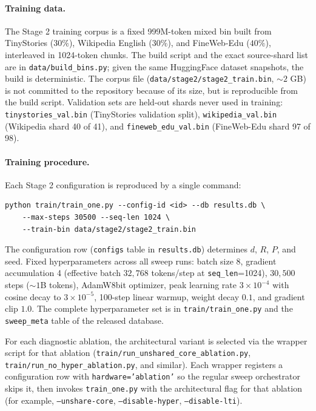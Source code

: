 \documentclass{article}
\begin{document}
\paragraph{Training data.}
The Stage 2 training corpus is a fixed 999M-token mixed bin built from TinyStories ($30\%$), Wikipedia English ($30\%$), and FineWeb-Edu ($40\%$), interleaved in 1024-token chunks. The build script and the exact source-shard list are in \texttt{data/build\_bins.py}; given the same HuggingFace dataset snapshots, the build is deterministic. The corpus file (\texttt{data/stage2/stage2\_train.bin}, $\sim 2$ GB) is not committed to the repository because of its size, but is reproducible from the build script. Validation sets are held-out shards never used in training: \texttt{tinystories\_val.bin} (TinyStories validation split), \texttt{wikipedia\_val.bin} (Wikipedia shard 40 of 41), and \texttt{fineweb\_edu\_val.bin} (FineWeb-Edu shard 97 of 98).

\paragraph{Training procedure.}
Each Stage 2 configuration is reproduced by a single command:
\begin{verbatim}
python train/train_one.py --config-id <id> --db results.db \
    --max-steps 30500 --seq-len 1024 \
    --train-bin data/stage2/stage2_train.bin
\end{verbatim}
The configuration row (\texttt{configs} table in \texttt{results.db}) determines $d$, $R$, $P$, and seed. Fixed hyperparameters across all sweep runs: batch size 8, gradient accumulation 4 (effective batch $32{,}768$ tokens/step at \texttt{seq\_len}=1024), $30{,}500$ steps ($\sim 1$B tokens), AdamW8bit optimizer, peak learning rate $3 \times 10^{-4}$ with cosine decay to $3 \times 10^{-5}$, 100-step linear warmup, weight decay $0.1$, and gradient clip $1.0$. The complete hyperparameter set is in \texttt{train/train\_one.py} and the \texttt{sweep\_meta} table of the released database.

For each diagnostic ablation, the architectural variant is selected via the wrapper script for that ablation (\texttt{train/run\_unshared\_core\_ablation.py}, \texttt{train/run\_no\_hyper\_ablation.py}, and similar). Each wrapper registers a configuration row with \texttt{hardware='ablation'} so the regular sweep orchestrator skips it, then invokes \texttt{train\_one.py} with the architectural flag for that ablation (for example, \texttt{--unshare-core}, \texttt{--disable-hyper}, \texttt{--disable-lti}).
\end{document}
